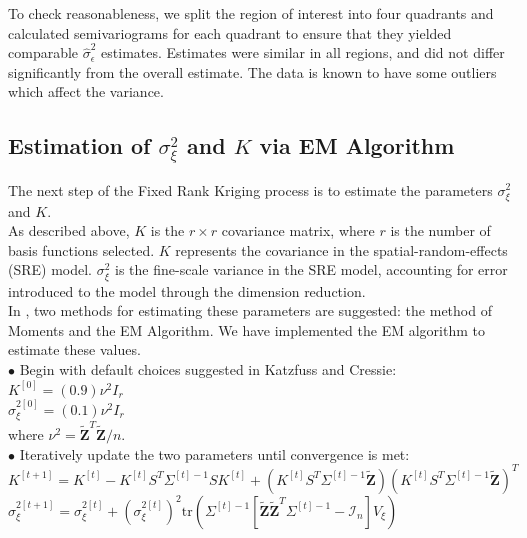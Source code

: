 \documentclass[11pt]{article}
\newcommand{\myindent}{\hspace*{1cm}}
\begin{document}
To check reasonableness, we split the region of interest into four quadrants and calculated semivariograms for each quadrant to ensure that they yielded comparable $\hat{\sigma}^2_\epsilon$ estimates. Estimates were similar in all regions, and did not differ significantly from the overall estimate.   The data is known to have some outliers which affect the variance.\\


\subsection{Estimation of $\sigma^2_{\xi}$ and $K$ via EM Algorithm}

The next step of the Fixed Rank Kriging process is to estimate the parameters $\sigma^2_{\xi}$ and $K$.  \\

As described above, $K$ is the $r \times r$ covariance matrix, where $r$ is the number of basis functions selected.  $K$ represents the covariance in the spatial-random-effects (SRE) model. $\sigma^2_{\xi}$ is the fine-scale variance in the SRE model, accounting for error introduced to the model through the dimension reduction. \\

In \cite{Katzfuss}, two methods for estimating these parameters are suggested: the method of Moments and the EM Algorithm.  We have implemented the EM algorithm to estimate these values.\\

\myindent $\bullet$ Begin with default choices suggested in Katzfuss and Cressie: \\

\myindent \myindent $K^{[0]} = (0.9)\nu ^2 I_r$ \\
\myindent \myindent $\sigma_\xi^{2[0]} = (0.1)\nu ^2 I_r$ \\
\myindent \myindent \myindent where $\nu^2 = \tilde{\bm{Z}}^T\tilde{\bm{Z}}/n$.\\

\myindent $\bullet$ Iteratively update the two parameters until convergence is met:\\

\myindent \myindent $K^{[t+1]} = K^{[t]} - K^{[t]} S^T \Sigma^{[t]-1}SK^{[t]}
  + \left(K^{[t]}S^T \Sigma^{[t]-1} \tilde{\bm{Z}} \right)\left(K^{[t]}S^T \Sigma^{[t]-1} \tilde{\bm{Z}} \right)^T$ \\
\myindent \myindent $\sigma_\xi^{2[t+1]} = \sigma_\xi^{2[t]} + \left(\sigma_\xi^{2[t]} \right)^2 \text{tr} \left(\Sigma^{[t]-1}[\tilde{\bm{Z}}\tilde{\bm{Z}}^T\Sigma^{[t]-1} - \mathcal{I}_n]V_\xi \right)$\\
\end{document}

